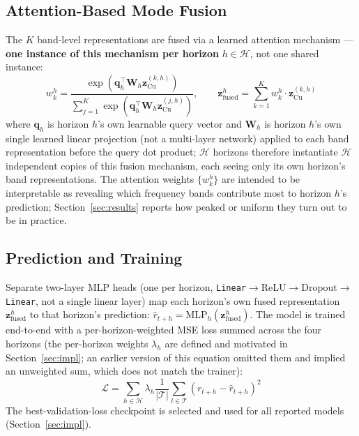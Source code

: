 \documentclass[journal]{IEEEtran}
\begin{document}
\subsection{Attention-Based Mode Fusion}

The $K$ band-level representations are fused via a learned attention mechanism --- \textbf{one instance of this mechanism per horizon} $h \in \mathcal{H}$, not one shared instance:
\begin{equation}
\label{eq:fusion}
w_k^h = \frac{\exp(\mathbf{q}_h^\top \mathbf{W}_h\mathbf{z}^{(k,h)}_{\text{Cu}})}{\sum_{j=1}^{K} \exp(\mathbf{q}_h^\top \mathbf{W}_h\mathbf{z}^{(j,h)}_{\text{Cu}})}, \qquad \mathbf{z}_{\text{fused}}^h = \sum_{k=1}^{K} w_k^h \cdot \mathbf{z}^{(k,h)}_{\text{Cu}}
\end{equation}
where $\mathbf{q}_h$ is horizon $h$'s own learnable query vector and $\mathbf{W}_h$ is horizon $h$'s own single learned linear projection (not a multi-layer network) applied to each band representation before the query dot product; $\mathcal{H}$ horizons therefore instantiate $\mathcal{H}$ independent copies of this fusion mechanism, each seeing only its own horizon's band representations. The attention weights $\{w_k^h\}$ are intended to be interpretable as revealing which frequency bands contribute most to horizon $h$'s prediction; Section~\ref{sec:results} reports how peaked or uniform they turn out to be in practice.

\subsection{Prediction and Training}

Separate two-layer MLP heads (one per horizon, \texttt{Linear}$\to$ReLU$\to$Dropout$\to$\texttt{Linear}, not a single linear layer) map each horizon's own fused representation $\mathbf{z}_{\text{fused}}^h$ to that horizon's prediction:
$\hat{r}_{t+h} = \text{MLP}_h(\mathbf{z}_{\text{fused}}^h)$. The model is trained end-to-end with a per-horizon-weighted MSE loss summed across the four horizons (the per-horizon weights $\lambda_h$ are defined and motivated in Section~\ref{sec:impl}; an earlier version of this equation omitted them and implied an unweighted sum, which does not match the trainer):
\begin{equation}
\mathcal{L} = \sum_{h \in \mathcal{H}} \lambda_h \frac{1}{|\mathcal{T}|} \sum_{t \in \mathcal{T}} (r_{t+h} - \hat{r}_{t+h})^2
\end{equation}
The best-validation-loss checkpoint is selected and used for all reported models (Section~\ref{sec:impl}).
\end{document}
